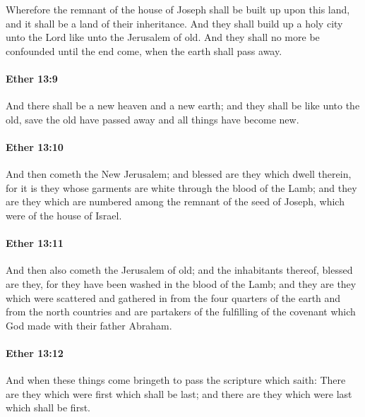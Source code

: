 			Wherefore the remnant of the house of Joseph shall be built up upon this land,
			and it shall be a land of their inheritance.
			And they shall build up a holy city unto the Lord like unto the Jerusalem of old.
			And they shall no more be confounded until the end come,
			when the earth shall pass away.

		\paragraph{Ether 13:9} %
			\label{ETHER-13-9}

			And there shall be a new heaven and a new earth;
			and they shall be like unto the old,
			save the old have passed away and all things have become new.

		\paragraph{Ether 13:10} %
			\label{ETHER-13-10}

			And then cometh the New Jerusalem;
			and blessed are they which dwell therein,
			for it is they whose garments are white through the blood of the Lamb;
			and they are they which are numbered among the remnant of the seed of Joseph,
			which were of the house of Israel.

		\paragraph{Ether 13:11} %
			\label{ETHER-13-11}

			And then also cometh the Jerusalem of old;
			and the inhabitants thereof, blessed are they,
			for they have been washed in the blood of the Lamb;
			and they are they which were scattered and gathered in
			from the four quarters of the earth and from the north countries
			and are partakers of the fulfilling of the covenant
			which God made with their father Abraham.

		\paragraph{Ether 13:12} %
			\label{ETHER-13-12}

			And when these things come
			bringeth to pass the scripture which saith:
			There are they which were first which shall be last;
			and there are they which were last which shall be first.

